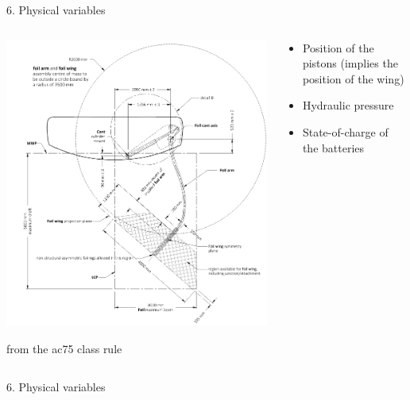 \documentclass[presentation,aspectratio=169]{beamer}
\begin{document}
\begin{frame}[label={sec:org0a34444}]{6. Physical variables}
\begin{columns}
\begin{column}{0.5\columnwidth}
\begin{center}
\includegraphics[height=0.8\textheight]{../../figures/ac75-class-foil.png}
\end{center}

{\footnotesize from the ac75 class rule}
\end{column}
\begin{column}{0.5\columnwidth}
\begin{itemize}
\item Position of the pistons (implies the position of the wing)
\item Hydraulic pressure
\item State-of-charge of the batteries
\end{itemize}
\end{column}
\end{columns}
\end{frame}


\begin{frame}[label={sec:org1917d1f}]{6. Physical variables}
\end{frame}
\end{document}
